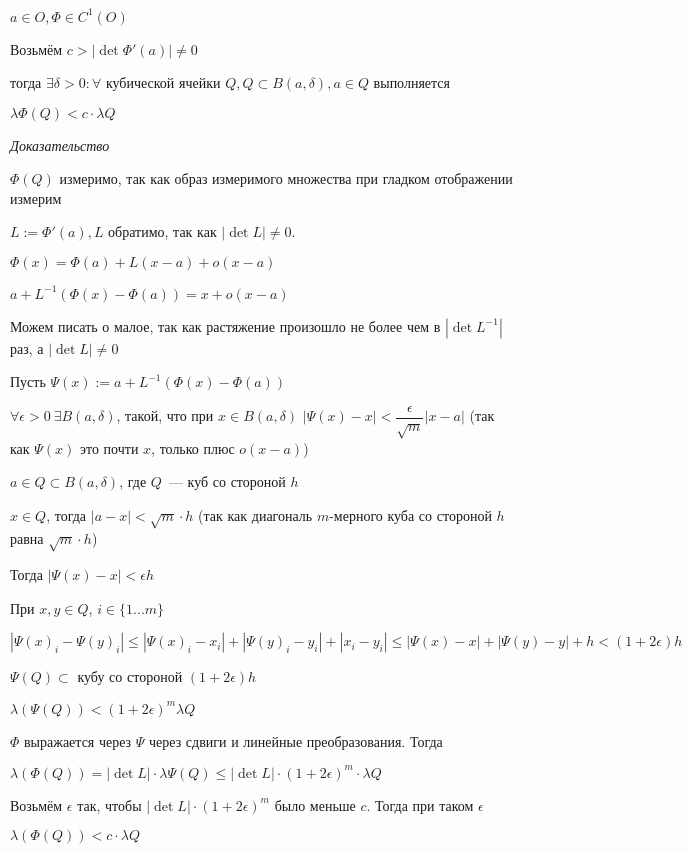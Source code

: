 \documentclass[paper=a4, fontsize=17pt]{article}
\begin{document}
$a \in O, \Phi \in C^1(O)$

Возьмём $c > |\det \Phi'(a)| \neq 0$

тогда $\exists \delta > 0: \forall$ кубической ячейки $Q, Q \subset B(a, \delta), a \in Q$ выполняется

$\lambda \Phi(Q) < c \cdot \lambda Q$

\emph{Доказательство}

$\Phi(Q)$ измеримо, так как образ измеримого множества при гладком отображении измерим

$L := \Phi'(a), L$ обратимо, так как $|\det L| \neq 0$.

$\Phi(x) = \Phi(a) + L(x - a) + o(x - a)$

$a + L^{-1} (\Phi(x) - \Phi(a)) = x + o(x - a)$

Можем писать о малое, так как растяжение произошло не более чем в $|\det L^{-1}|$ раз, а $|\det L| \neq 0$

Пусть $\Psi(x) := a + L^{-1} (\Phi(x) - \Phi(a))$

$\forall \epsilon > 0\ \exists B(a, \delta)$, такой, что при $x \in B(a, \delta)$ $|\Psi(x) - x| < \dfrac{\epsilon}{\sqrt{m}} |x - a|$ (так как $\Psi(x)$ это почти $x$, только плюс $o(x - a)$)

$a \in Q \subset B(a, \delta)$, где $Q$~--- куб со стороной $h$

$x \in Q$, тогда $|a - x| < \sqrt{m} \cdot h$ (так как диагональ $m$-мерного куба со стороной $h$ равна $\sqrt{m} \cdot h$)

Тогда $|\Psi(x) - x| < \epsilon h$

При $x, y \in Q$, $i \in \{1...m\}$

$|\Psi(x)_i - \Psi(y)_i| \leqslant |\Psi(x)_i - x_i| + |\Psi(y)_i - y_i| + |x_i - y_i| \leqslant |\Psi(x) - x| + |\Psi(y) - y| + h < (1 + 2 \epsilon)h$

$\Psi(Q) \subset$ кубу со стороной $(1 + 2 \epsilon) h$

$\lambda(\Psi(Q)) < (1 + 2 \epsilon)^m \lambda Q$

$\Phi$ выражается через $\Psi$ через сдвиги и линейные преобразования. Тогда

$\lambda(\Phi(Q)) = |\det L| \cdot \lambda \Psi(Q) \leqslant |\det L| \cdot (1 + 2 \epsilon)^m \cdot \lambda Q$

Возьмём $\epsilon$ так, чтобы $|\det L| \cdot (1 + 2 \epsilon)^m$ было меньше $c$. Тогда при таком $\epsilon$

$\lambda(\Phi(Q)) < c \cdot \lambda Q$
\end{document}
